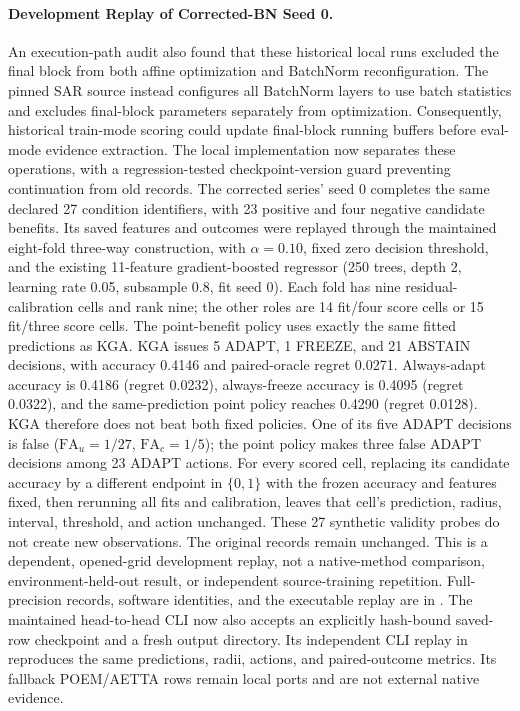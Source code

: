 \paragraph{Development Replay of Corrected-BN Seed 0.}
An execution-path audit also found that these historical local runs excluded
the final block from both affine optimization and BatchNorm reconfiguration.
The pinned SAR source instead configures all BatchNorm layers to use batch
statistics and excludes final-block parameters separately from optimization.
Consequently, historical train-mode scoring could update final-block running
buffers before eval-mode evidence extraction. The local implementation now
separates these operations, with a regression-tested checkpoint-version guard
preventing continuation from old records.
The corrected series' seed 0 completes the same declared 27 condition identifiers,
with 23 positive and four negative candidate benefits. Its saved features and outcomes
were replayed through the maintained eight-fold three-way construction, with
$\alpha=0.10$, fixed zero decision threshold, and the existing 11-feature gradient-boosted
regressor (250 trees, depth 2, learning rate 0.05, subsample 0.8, fit seed 0).
Each fold has nine residual-calibration cells and rank nine; the other roles are
14 fit/four score cells or 15 fit/three score cells. The point-benefit policy uses
exactly the same fitted predictions as KGA. KGA issues 5 ADAPT, 1 FREEZE, and
21 ABSTAIN decisions, with accuracy 0.4146 and paired-oracle regret 0.0271.
Always-adapt accuracy is 0.4186 (regret 0.0232), always-freeze accuracy is
0.4095 (regret 0.0322), and the same-prediction point policy reaches 0.4290
(regret 0.0128). KGA therefore does not beat both fixed policies. One of its five
ADAPT decisions is false ($\mathrm{FA}_u=1/27$, $\mathrm{FA}_c=1/5$); the point
policy makes three false ADAPT decisions among 23 ADAPT actions.
For every scored cell, replacing its candidate accuracy by a different endpoint
in $\{0,1\}$ with the frozen accuracy and features fixed, then rerunning all fits
and calibration, leaves that cell's prediction, radius, interval, threshold, and
action unchanged. These 27 synthetic validity probes do not create new observations.
The original records remain unchanged. This is a dependent, opened-grid development
replay, not a native-method comparison, environment-held-out result, or independent
source-training repetition. Full-precision records, software identities, and the executable
replay are in .
The maintained head-to-head CLI now also accepts an explicitly hash-bound saved-row
checkpoint and a fresh output directory. Its independent CLI replay in
 reproduces the
same predictions, radii, actions, and paired-outcome metrics. Its fallback POEM/AETTA
rows remain local ports and are not external native evidence.

